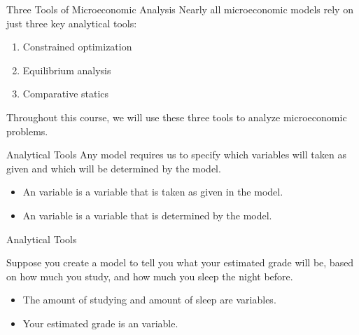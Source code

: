 \documentclass[12pt,t]{beamer}
\begin{document}
\begin{frame}{Three Tools of Microeconomic Analysis}
  Nearly all microeconomic models rely on just three key analytical tools:
  \begin{enumerate}
    \item Constrained optimization
    \item Equilibrium analysis
    \item Comparative statics
  \end{enumerate}

  \bigskip
  Throughout this course, we will use these three tools to analyze microeconomic problems.
\end{frame}

\begin{frame}{Analytical Tools}
  Any model requires us to specify which variables will taken as given and which will be determined by the model.
  \begin{itemize}
    \item An  variable is a variable that is taken as given in the model.
    \item An  variable is a variable that is determined by the model.
  \end{itemize}
\end{frame}

\begin{frame}{Analytical Tools}
  \bigskip
  
  Suppose you create a model to tell you what your estimated grade will be, based on how much you study, and how much you sleep the night before.
  \pause
  \begin{itemize}
    \item The amount of studying and amount of sleep are  variables.
    \item Your estimated grade is an  variable.
  \end{itemize}
\end{frame}
\end{document}
